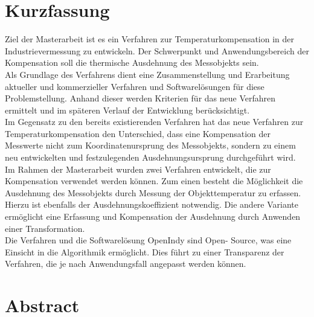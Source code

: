 
\pagestyle{empty}


\pagestyle{useheadings} %

\chapter*{Kurzfassung}\label{Kurzfassung}

Ziel der Masterarbeit ist es ein Verfahren zur Temperaturkompensation in der Industrievermessung zu entwickeln. Der Schwerpunkt und Anwendungsbereich der Kompensation soll die thermische Ausdehnung des Messobjekts sein.\\ 
Als Grundlage des Verfahrens dient eine Zusammenstellung und Erarbeitung aktueller und kommerzieller Verfahren und Softwarelösungen für diese Problemstellung. Anhand dieser werden Kriterien für das neue Verfahren ermittelt und im späteren Verlauf der Entwicklung berücksichtigt.\\
Im Gegensatz zu den bereits existierenden Verfahren hat das neue Verfahren zur Temperaturkompensation den Unterschied, dass eine Kompensation der Messwerte nicht zum Koordinatenursprung des Messobjekts, sondern zu einem neu entwickelten und festzulegenden Ausdehnungsursprung durchgeführt wird.\\
Im Rahmen der Masterarbeit wurden zwei Verfahren entwickelt, die zur Kompensation verwendet werden können. Zum einen besteht die Möglichkeit die Ausdehnung des Messobjekts durch Messung der Objekttemperatur zu erfassen. Hierzu ist ebenfalls der Ausdehnungskoeffizient notwendig. Die andere Variante ermöglicht eine Erfassung und Kompensation der Ausdehnung durch Anwenden einer Transformation.\\
Die Verfahren und die Softwarelösung OpenIndy sind Open- Source, was eine Einsicht in die Algorithmik ermöglicht. Dies führt zu einer Transparenz der Verfahren, die je nach Anwendungsfall angepasst werden können.

\chapter*{Abstract}\label{Abstract}

